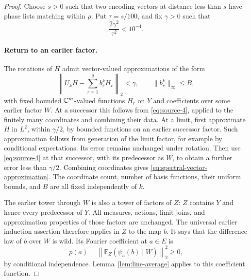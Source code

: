 \begin{proof}
Choose $s>0$ such that two encoding vectors at distance less than $s$
have phase lists matching within $\rho$. Put $\tau=s/100$, and fix
$\gamma>0$ such that
\begin{equation}\label{eq:spectral-error-choice}
 \frac{2\gamma^2}{\tau^2}<10^{-4}.
\end{equation}

\paragraph{Return to an earlier factor.}
The rotations of $H$ admit vector-valued approximations of the form
\begin{equation}\label{eq:spectral-vector-approximation}
 \left\|U_kH-\sum_{r=1}^q b_r^k H_r\right\|_2<\gamma,
 \qquad \|b_r^k\|_\infty\le B,
\end{equation}
with fixed bounded $\mathbb C^m$-valued functions $H_r$ on $Y$ and
coefficients over some earlier factor $W$. At a successor this follows
from \eqref{eq:source-4}, applied to the finitely many coordinates and
combining their data. At a limit, first approximate $H$ in $L^2$,
within $\gamma/2$, by bounded functions on an earlier successor
factor. Such approximation follows from generation of the limit
factor, for example by conditional expectations. Its error remains
unchanged under rotation. Then use \eqref{eq:source-4} at that
successor, with its predecessor as $W$, to obtain a further error less
than $\gamma/2$. Combining coordinates gives
\eqref{eq:spectral-vector-approximation}. The coordinate count,
number of basis functions, their uniform bounds, and $B$ are all fixed
independently of $k$.

The earlier tower through $W$ is also a tower of factors of $Z$:
$Z$ contains $Y$ and hence every predecessor of $Y$. All measures,
actions, limit joins, and approximation properties of those factors
are unchanged. The universal earlier induction assertion therefore
applies in $Z$ to the map $b$. It says that the difference law of $b$
over $W$ is wild. Its Fourier coefficient at $a\in E$ is
\begin{equation}\label{eq:spectral-conditional-coefficient}
 p(a)=\left\|\mathbb E_Z(\psi_a(b)\mid W)\right\|_2^2\ge0,
\end{equation}
by conditional independence. Lemma~\ref{lem:line-average} applies to
this coefficient function.


\end{proof}
